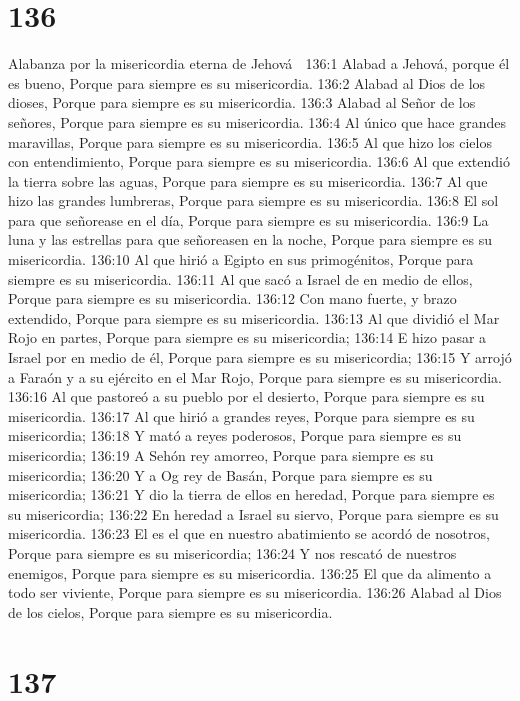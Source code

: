\chapter{136}

Alabanza por la misericordia eterna de Jehová 

136:1 Alabad a Jehová, porque él es bueno, 
Porque para siempre es su misericordia. 
136:2 Alabad al Dios de los dioses, 
Porque para siempre es su misericordia. 
136:3 Alabad al Señor de los señores, 
Porque para siempre es su misericordia. 
136:4 Al único que hace grandes maravillas, 
Porque para siempre es su misericordia. 
136:5 Al que hizo los cielos con entendimiento, 
Porque para siempre es su misericordia. 
136:6 Al que extendió la tierra sobre las aguas, 
Porque para siempre es su misericordia. 
136:7 Al que hizo las grandes lumbreras, 
Porque para siempre es su misericordia. 
136:8 El sol para que señorease en el día, 
Porque para siempre es su misericordia. 
136:9 La luna y las estrellas para que señoreasen en la noche, 
Porque para siempre es su misericordia. 
136:10 Al que hirió a Egipto en sus primogénitos, 
Porque para siempre es su misericordia. 
136:11 Al que sacó a Israel de en medio de ellos, 
Porque para siempre es su misericordia. 
136:12 Con mano fuerte, y brazo extendido, 
Porque para siempre es su misericordia. 
136:13 Al que dividió el Mar Rojo en partes, 
Porque para siempre es su misericordia; 
136:14 E hizo pasar a Israel por en medio de él, 
Porque para siempre es su misericordia; 
136:15 Y arrojó a Faraón y a su ejército en el Mar Rojo, 
Porque para siempre es su misericordia. 
136:16 Al que pastoreó a su pueblo por el desierto, 
Porque para siempre es su misericordia. 
136:17 Al que hirió a grandes reyes, 
Porque para siempre es su misericordia; 
136:18 Y mató a reyes poderosos, 
Porque para siempre es su misericordia; 
136:19 A Sehón rey amorreo, 
Porque para siempre es su misericordia; 
136:20 Y a Og rey de Basán, 
Porque para siempre es su misericordia; 
136:21 Y dio la tierra de ellos en heredad, 
Porque para siempre es su misericordia; 
136:22 En heredad a Israel su siervo, 
Porque para siempre es su misericordia. 
136:23 El es el que en nuestro abatimiento se acordó de nosotros, 
Porque para siempre es su misericordia; 
136:24 Y nos rescató de nuestros enemigos, 
Porque para siempre es su misericordia. 
136:25 El que da alimento a todo ser viviente, 
Porque para siempre es su misericordia. 
136:26 Alabad al Dios de los cielos, 
Porque para siempre es su misericordia. 

\chapter{137}

